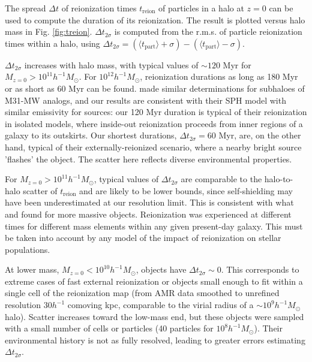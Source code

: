 \documentclass[twocolumn]{aastex61}
\begin{document}
%

The spread $\Delta t$ of reionization times $t_\mathrm{reion}$ of particles in a halo at $z = 0$ can be used to compute the duration of its reionization. The result is plotted versus halo mass in Fig. \ref{fig:treion}. $\Delta t_{2\sigma}$ is computed from the r.m.s. of particle reionization times within a halo, using $\Delta t_{2\sigma}=(\langle t_\mathrm{part}\rangle+\sigma)-(\langle t_\mathrm{part}\rangle-\sigma)$. 

$\Delta t_{2\sigma}$ increases with halo mass, with typical values of $\sim 120$ Myr for $M_{z=0}>10^{11} h^{-1} M_\odot$. For $10^{12} h^{-1} M_\odot$, reionization durations as long as 180 Myr or as short as 60 Myr can be found. \citet{OCV14} made similar determinations for subhaloes of M31-MW analogs, and our results are consistent with their SPH model with similar emissivity for sources: our 120 Myr duration is typical of their reionization in isolated models, where inside-out reionization proceeds from inner regions of a galaxy to its outskirts.  Our shortest durations, $\Delta t_{2\sigma}=60$ Myr, are, on the other hand, typical of their externally-reionized scenario, where a nearby bright source 'flashes' the object. The scatter here reflects diverse environmental properties.

For $M_{z=0}>10^{11}h^{-1} M_\odot$, typical values of $\Delta t_{2\sigma}$ are comparable to the halo-to-halo scatter of $t_\mathrm{reion}$ and are likely to be lower bounds, since self-shielding may have been underestimated at our resolution limit. This is consistent with what \citet{ALV9} and \citet{LI14} found for more massive objects. Reionization was experienced at different times for different mass elements within any given present-day galaxy. This must be taken into account by any model of the impact of reionization on stellar populations. 

At lower mass, $M_{z=0}<10^{10}h^{-1} M_\odot$, objects have $\Delta t_{2\sigma}\sim 0$. This corresponds to extreme cases of fast external reionization or objects small enough to fit within a single cell of the reionization map (from AMR data smoothed to unrefined resolution $30 h^{-1}$ comoving kpc, comparable to the virial radius of a $\sim 10^9 h^{-1} M_\odot$ halo). Scatter increases toward the low-mass end, but these objects were sampled with a small number of cells or particles (40 particles for $10^8 h^{-1} M_\odot$). Their environmental history is not as fully resolved, leading to greater errors estimating $\Delta t_{2\sigma}$.
\end{document}
